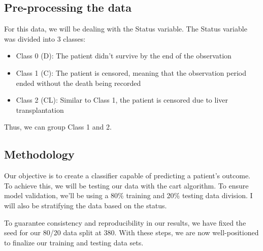 \documentclass[
]{article}
\newenvironment{Shaded}{\begin{snugshade}}{\end{snugshade}}
\newcommand{\CommentTok}[1]{\textcolor[rgb]{0.56,0.35,0.01}{\textit{#1}}}
\newcommand{\DecValTok}[1]{\textcolor[rgb]{0.00,0.00,0.81}{#1}}
\newcommand{\FunctionTok}[1]{\textcolor[rgb]{0.13,0.29,0.53}{\textbf{#1}}}
\newcommand{\NormalTok}[1]{#1}
\newcommand{\OtherTok}[1]{\textcolor[rgb]{0.56,0.35,0.01}{#1}}
\newcommand{\SpecialCharTok}[1]{\textcolor[rgb]{0.81,0.36,0.00}{\textbf{#1}}}
\newcommand{\StringTok}[1]{\textcolor[rgb]{0.31,0.60,0.02}{#1}}
\providecommand{\tightlist}{%
  \setlength{\itemsep}{0pt}\setlength{\parskip}{0pt}}
\begin{document}
\hypertarget{pre-processing-the-data}{%
\subsection{Pre-processing the data}\label{pre-processing-the-data}}

For this data, we will be dealing with the Status variable. The Status
variable was divided into 3 classes:

\begin{itemize}
\tightlist
\item
  Class 0 (D): The patient didn't survive by the end of the observation
\item
  Class 1 (C): The patient is censored, meaning that the observation
  period ended without the death being recorded
\item
  Class 2 (CL): Similar to Class 1, the patient is censored due to liver
  transplantation
\end{itemize}

Thus, we can group Class 1 and 2.

\begin{Shaded}
\end{Shaded}

\hypertarget{methodology}{%
\subsection{Methodology}\label{methodology}}

Our objective is to create a classifier capable of predicting a
patient's outcome. To achieve this, we will be testing our data with the
cart algorithm. To ensure model validation, we'll be using a 80\%
training and 20\% testing data division. I will also be stratifying the
data based on the status.

To guarantee consistency and reproducibility in our results, we have
fixed the seed for our 80/20 data split at 380. With these steps, we are
now well-positioned to finalize our training and testing data sets.
\end{document}
